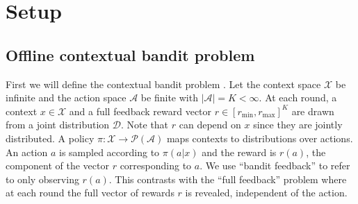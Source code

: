 







\section{Setup}\label{sec:setup}
\subsection{Offline contextual bandit problem}

First we will define the contextual bandit problem \citep{langford2008epoch}. Let the context space $ \mathcal{X} $ be infinite and the action space $ \mathcal{A}$ be finite with $ |\mathcal{A}| = K < \infty$.
At each round, a context $ x \in \mathcal{X}$ and a full feedback reward vector $ r \in [r_{\mathrm{min}},r_{\mathrm{max}}]^K$ are drawn from a joint distribution $ \mathcal{D}$.
Note that $ r $ can depend on $ x $ since they are jointly distributed.
A policy $\pi: \mathcal{X} \to \mathcal{P}(\mathcal{A})$ maps contexts to distributions over actions. An action $ a $ is sampled according to $ \pi(a|x)$ and the reward is $ r(a)$, the component of the vector $ r $ corresponding to $ a$.
We use ``bandit feedback'' to refer to only observing $ r(a)$.
This contrasts with the ``full feedback'' problem
where at each round the full vector of rewards $ r$ is revealed, independent of the action.

